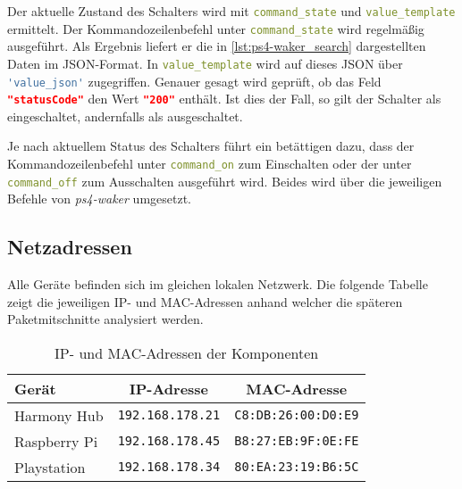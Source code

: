 Der aktuelle Zustand des Schalters wird mit \lstinline[language=yaml]{command_state} und
\lstinline[language=yaml]{value_template} ermittelt.
Der Kommandozeilenbefehl unter \lstinline[language=yaml]{command_state} wird regelmäßig ausgeführt.
Als Ergebnis liefert er die in \autoref{lst:ps4-waker_search} dargestellten Daten im JSON-Format.
In \lstinline[language=yaml]{value_template} wird auf dieses JSON über
\lstinline[language=yaml]{'value_json'} zugegriffen.
Genauer gesagt wird geprüft,
ob das Feld \lstinline[language=json]{"statusCode"} den Wert
\lstinline[language=json]{"200"} enthält.
Ist dies der Fall, so gilt der Schalter als eingeschaltet, andernfalls als ausgeschaltet.



Je nach aktuellem Status des Schalters führt ein betättigen dazu, dass der Kommandozeilenbefehl unter \lstinline[language=yaml]{command_on} zum Einschalten
oder der unter \lstinline[language=yaml]{command_off} zum Ausschalten ausgeführt wird.
Beides wird über die jeweiligen Befehle von \textit{ps4-waker} umgesetzt.


\subsection{Netzadressen}\label{sec:aufbau-adressen}
Alle Geräte befinden sich im gleichen lokalen Netzwerk.
Die folgende Tabelle zeigt die jeweiligen IP- und MAC-Adressen anhand welcher die
späteren Paketmitschnitte analysiert werden.

\begin{table}[h!]
    \centering
    \begin{tabular}{l||c|c}
        Gerät           & IP-Adresse      &  MAC-Adresse          \\
        \hline
        \hline
        Harmony Hub     & \texttt{192.168.178.21}  &  \texttt{C8:DB:26:00:D0:E9}  \\
        \hline
        Raspberry Pi    & \texttt{192.168.178.45}  &  \texttt{B8:27:EB:9F:0E:FE}  \\
        \hline
        Playstation     & \texttt{192.168.178.34}  &  \texttt{80:EA:23:19:B6:5C}   \\
    \end{tabular}
    \caption{IP- und MAC-Adressen der Komponenten}
    \label{ex:netzadressen}
\end{table}
